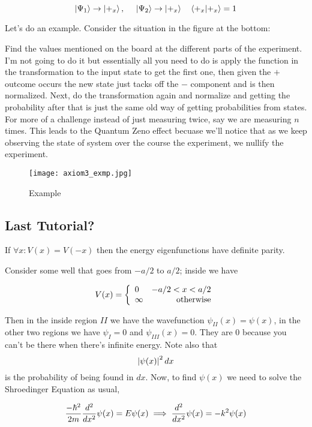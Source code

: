 \documentclass[english, 11pt]{article}
\begin{document}
      \[ \ket{\Psi_1} \rightarrow \ket{+_x}, \ \ \ \ \ket{\Psi_2} \rightarrow \ket{+_x} \ \ \ \braket{+_x}{+_x} = 1 \]

      Let's do an example. Consider the situation in the figure at the bottom:

      Find the values mentioned on the board at the different parts of the experiment. I'm not going to do it but essentially all you need to do is apply the function in the transformation to the input state to get the first one, then given the $+$ outcome occurs the new state just tacks off the $-$ component and is then normalized. Next, do the transformation again and normalize and getting the probability after that is just the same old way of getting probabilities from states. For more of a challenge instead of just measuring twice, say we are measuring $n$ times. This leads to the Quantum Zeno effect becuase we'll notice that as we keep observing the state of system over the course the experiment, we nullify the experiment.

      \begin{figure}[b!]
            \centering
            \texttt{[image: axiom3\_exmp.jpg]}
            \caption{Example}
      \end{figure}

      \subsection{Last Tutorial?}

        \begin{thrm}
          If $\forall x: V(x) = V(-x)$ then the energy eigenfunctions have definite parity.
        \end{thrm}

        Consider some well that goes from $-a/2$ to $a/2$; inside we have

        \[ V(x) = \left\{ \begin{array}{lr} 0 & \mbox{$-a/2 < x < a/2$} \\ \infty & \mbox{otherwise} \end{array} \right. \]

        Then in the inside region $II$ we have the wavefunction $\psi_{II}(x) = \psi(x)$, in the other two regions we have $\psi_{I} = 0$ and $\psi_{III}(x) = 0$. They are 0 because you can't be there when there's infinite energy. Note also that
        \[ \left|\psi(x)\right|^2 dx \]
        is the probability of being found in $dx$. Now, to find $\psi(x)$ we need to solve the Shroedinger Equation as usual,

        \[ \frac{-\hbar^2}{2m} \frac{d^2}{dx^2} \psi(x) = E\psi(x) \implies \frac{d^2}{dx^2} \psi(x) = -k^2\psi(x)\]
\end{document}
